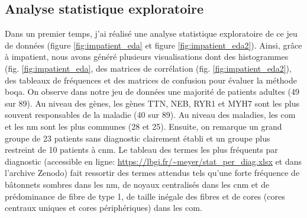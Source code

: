 \subsection{Analyse statistique exploratoire}
Dans un premier temps, j'ai réalisé une analyse statistique exploratoire de ce jeu de données (figure \ref{fig:impatient_eda} et figure \ref{fig:impatient_eda2}). Ainsi, grâce à \gls{impatient}, nous avons généré plusieurs visualisations dont des histogrammes (fig. \ref{fig:impatient_eda}, des matrices de corrélation (fig. \ref{fig:impatient_eda2}), des tableaux de fréquences et des matrices de confusion pour évaluer la méthode \gls{boqa}.  On observe dans notre jeu de données une majorité de patients adultes (49 sur 89). Au niveau des gènes, les gènes TTN, NEB, RYR1 et MYH7 sont les plus souvent responsables de la maladie (40 sur 89). Au niveau des maladies, les \gls{com} et les \gls{nm} sont les plus communes (28 et 25). Ensuite, on remarque un grand groupe de 23 patients sans diagnostic clairement établi et un groupe plus restreint de 10 patients à \gls{cnm}. Le tableau des termes les plus fréquents par diagnostic (accessible en ligne: \url{https://lbgi.fr/~meyer/stat_per_diag.xlsx} et dans l'archive Zenodo) fait ressortir des termes attendus tels qu’une forte fréquence de bâtonnets sombres dans les \gls{nm}, de noyaux centralisés dans les \gls{cnm} et de prédominance de fibre de type 1, de taille inégale des fibres et de cores (cores centraux uniques et cores périphériques) dans les \gls{com}.


